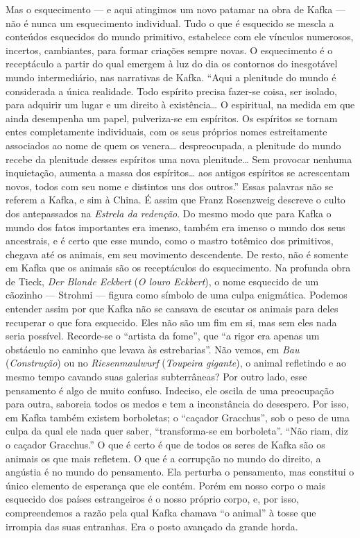 Mas o esquecimento --- e aqui atingimos um novo patamar na obra de Kafka
--- não é nunca um esquecimento individual. Tudo o que é esquecido se
mescla a conteúdos esquecidos do mundo primitivo, estabelece com ele
vínculos numerosos, incertos, cambiantes, para formar criações sempre
novas. O esquecimento é o receptáculo a partir do qual emergem à luz do
dia os contornos do inesgotável mundo intermediário, nas narrativas de
Kafka. ``Aqui a plenitude do mundo é considerada a única realidade. Todo
espírito precisa fazer-se coisa, ser isolado, para adquirir um lugar e
um direito à existência\ldots{} O espiritual, na medida em que ainda
desempenha um papel, pulveriza-se em espíritos. Os espíritos se tornam
entes completamente individuais, com os seus próprios nomes
estreitamente associados ao nome de quem os venera\ldots{} despreocupada, a
plenitude do mundo recebe da plenitude desses espíritos uma nova
plenitude\ldots{} Sem provocar nenhuma inquietação, aumenta a massa dos
espíritos\ldots{} aos antigos espíritos se acrescentam novos, todos com seu
nome e distintos uns dos outros.'' Essas palavras não se referem a
Kafka, e sim à China. É assim que Franz Rosenzweig descreve o culto dos
antepassados na \textit{Estrela da redenção}. Do mesmo modo que para Kafka o
mundo dos fatos importantes era imenso, também era imenso o mundo dos
seus ancestrais, e é certo que esse mundo, como o mastro totêmico dos
primitivos, chegava até os animais, em seu movimento descendente. De
resto, não é somente em Kafka que os animais são os receptáculos do
esquecimento. Na profunda obra de Tieck, \textit{Der Blonde Eckbert} (\textit{O louro
Eckbert}), o nome esquecido de um cãozinho --- Strohmi --- figura como
símbolo de uma culpa enigmática. Podemos entender assim por que Kafka
não se cansava de escutar os animais para deles recuperar o que fora
esquecido. Eles não são um fim em si, mas sem eles nada seria possível.
Recorde-se o ``artista da fome'', que ``a rigor era apenas um obstáculo
no caminho que levava às estrebarias''. Não vemos, em \textit{Bau}
(\textit{Construção}) ou no \textit{Riesenmaulwurf} (\textit{Toupeira gigante}), o animal
refletindo e ao mesmo tempo cavando suas galerias subterrâneas? Por
outro lado, esse pensamento é algo de muito confuso. Indeciso, ele
oscila de uma preocupação para outra, saboreia todos os medos e tem a
inconstância do desespero. Por isso, em Kafka também existem borboletas;
o ``caçador Gracchus'', sob o peso de uma culpa da qual ele nada quer
saber, ``transforma-se em borboleta''. ``Não riam, diz o caçador
Gracchus.'' O que é certo é que de todos os seres de Kafka são os
animais os que mais refletem. O que é a corrupção no mundo do direito, a
angústia é no mundo do pensamento. Ela perturba o pensamento, mas
constitui o único elemento de esperança que ele contém. Porém em nosso
corpo o mais esquecido dos países estrangeiros é o nosso próprio corpo,
e, por isso, compreendemos a razão pela qual Kafka chamava ``o animal''
à tosse que irrompia das suas entranhas. Era o posto avançado da grande
horda.

